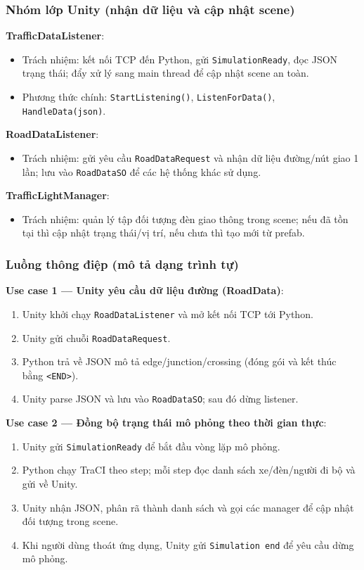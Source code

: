 \documentclass[../DoAn.tex]{subfiles}
\begin{document}
\subsubsection*{Nhóm lớp Unity (nhận dữ liệu và cập nhật scene)}
\textbf{TrafficDataListener}:
\begin{itemize}
	\item Trách nhiệm: kết nối TCP đến Python, gửi \texttt{SimulationReady}, đọc JSON trạng thái; đẩy xử lý sang main thread để cập nhật scene an toàn.
	\item Phương thức chính: \texttt{StartListening()}, \texttt{ListenForData()}, \texttt{HandleData(json)}.
\end{itemize}

\textbf{RoadDataListener}:
\begin{itemize}
	\item Trách nhiệm: gửi yêu cầu \texttt{RoadDataRequest} và nhận dữ liệu đường/nút giao 1 lần; lưu vào \texttt{RoadDataSO} để các hệ thống khác sử dụng.
\end{itemize}

\textbf{TrafficLightManager}:
\begin{itemize}
	\item Trách nhiệm: quản lý tập đối tượng đèn giao thông trong scene; nếu đã tồn tại thì cập nhật trạng thái/vị trí, nếu chưa thì tạo mới từ prefab.
\end{itemize}

\subsubsection*{Luồng thông điệp (mô tả dạng trình tự)}
\textbf{Use case 1 --- Unity yêu cầu dữ liệu đường (RoadData)}:
\begin{enumerate}
	\item Unity khởi chạy \texttt{RoadDataListener} và mở kết nối TCP tới Python.
	\item Unity gửi chuỗi \texttt{RoadDataRequest}.
	\item Python trả về JSON mô tả edge/junction/crossing (đóng gói và kết thúc bằng \texttt{<END>}).
	\item Unity parse JSON và lưu vào \texttt{RoadDataSO}; sau đó dừng listener.
\end{enumerate}

\textbf{Use case 2 --- Đồng bộ trạng thái mô phỏng theo thời gian thực}:
\begin{enumerate}
	\item Unity gửi \texttt{SimulationReady} để bắt đầu vòng lặp mô phỏng.
	\item Python chạy TraCI theo step; mỗi step đọc danh sách xe/đèn/người đi bộ và gửi về Unity.
	\item Unity nhận JSON, phân rã thành danh sách và gọi các manager để cập nhật đối tượng trong scene.
	\item Khi người dùng thoát ứng dụng, Unity gửi \texttt{Simulation end} để yêu cầu dừng mô phỏng.
\end{enumerate}
\end{document}
